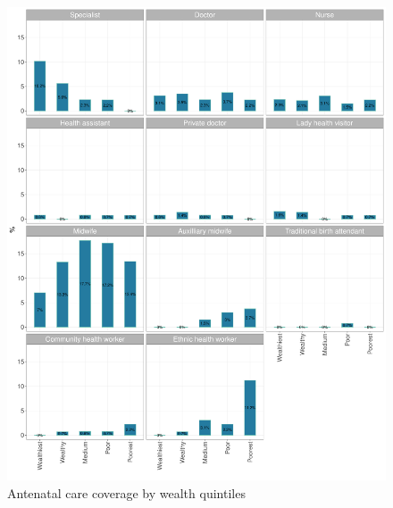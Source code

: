 \documentclass[12pt,a4paper]{article}
\begin{document}
\begin{figure}[H]

{\centering \includegraphics{kayinReport_files/figure-latex/anc2plot-1} 

}

\caption{Antenatal care coverage by wealth quintiles}\label{fig:anc2plot}
\end{figure}
\end{document}
